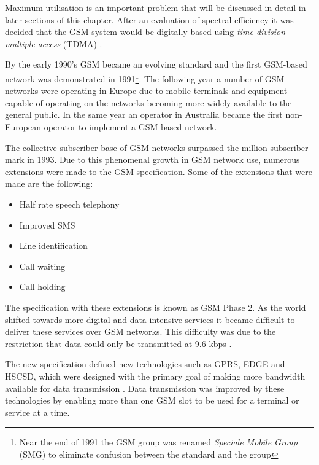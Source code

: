 Maximum utilisation is an important problem that will be discussed in detail in later sections of this chapter. After an evaluation of spectral efficiency it was decided that the GSM system would be digitally based using \emph{time division multiple access} (TDMA) \cite{GSM92,GSMSysEngin,Eisenblatter}.

By the early 1990’s GSM became an evolving standard and the first GSM-based network was demonstrated in 1991\footnote{Near the end of 1991 the GSM group was renamed \emph{Speciale Mobile Group} (SMG) to eliminate confusion between the standard and the group}\cite{Karen2004,GSM92,GSMArchitectureProtocolsServices,Eisenblatter}. The following year a number of GSM networks were operating in Europe due to mobile terminals and equipment capable of operating on the networks becoming more widely available to the general public\cite{Karen2004,GSM92,GSMArchitectureProtocolsServices,Eisenblatter}. In the same year an operator in Australia became the first non-European operator to implement a GSM-based network\cite{Eisenblatter}.

The collective subscriber base of GSM networks surpassed the million subscriber mark in 1993. Due to this phenomenal growth in GSM network use, numerous extensions were made to the GSM specification. 
Some of the extensions that were made are the following\cite{Karen2004,GSM92,GSMArchitectureProtocolsServices,Eisenblatter}:
\begin{itemize}
\item Half rate speech telephony
\item Improved SMS
\item Line identification
\item Call waiting
\item Call holding
\end{itemize}
The specification with these extensions is known as GSM Phase 2. As the world shifted towards more digital and data-intensive services it became difficult to deliver these services over GSM networks. This difficulty was due to the restriction that data could only be transmitted at 9.6 kbps \cite{GSM92,Karen2004}.

The new specification defined new technologies such as GPRS, EDGE and HSCSD, which were designed with the primary goal of making more bandwidth available for data transmission \cite{GSMArchitectureProtocolsServices,Karen2004}. Data transmission was improved by these technologies by enabling more than one GSM slot to be used for a terminal or service at a time\cite{GSMArchitectureProtocolsServices,Karen2004}.

